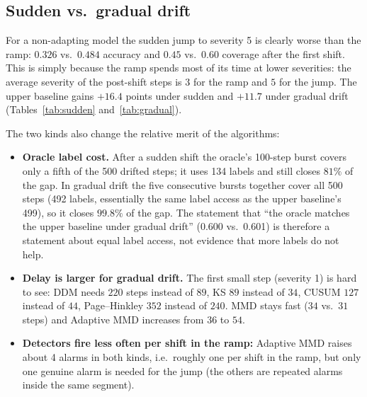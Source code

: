 \documentclass[11pt,a4paper]{article}
\begin{document}
\subsection{Sudden vs.\ gradual drift}

For a non-adapting model the sudden jump to severity 5 is clearly worse than the ramp: $0.326$ vs.\ $0.484$ accuracy
and $0.45$ vs.\ $0.60$ coverage after the first shift. This is simply because the ramp spends most of its time at lower severities: the average severity of the post-shift steps
is $3$ for the ramp and $5$ for the jump.
The upper baseline gains $+16.4$ points under sudden and $+11.7$ under gradual drift (Tables~\ref{tab:sudden} and~\ref{tab:gradual}).

The two kinds also change the relative merit of the algorithms:
\begin{itemize}
 \item \textbf{Oracle label cost.} After a sudden shift the oracle's 100-step burst covers only a fifth of the 500 drifted steps; it uses 134 labels and still closes $81\%$ of the gap.
 In gradual drift the five consecutive bursts together cover all 500 steps (492 labels, essentially the same label access as the upper baseline's 499), so it closes $99.8\%$ of the gap. The statement that ``the oracle matches the upper baseline under gradual drift'' (0.600 vs.\ 0.601) is therefore a statement about equal label access, not evidence that more labels do not help.
 \item \textbf{Delay is larger for gradual drift.} The first small step (severity 1) is hard to see: DDM needs $220$ steps instead of $89$, KS $89$ instead of $34$, CUSUM $127$ instead of $44$, Page--Hinkley $352$ instead of $240$. MMD stays fast ($34$ vs.\ $31$ steps) and Adaptive MMD increases from $36$ to $54$.
 \item \textbf{Detectors fire less often per shift in the ramp:} Adaptive MMD raises about 4 alarms in both kinds, i.e.\ roughly one per shift in the ramp, but only one genuine alarm is needed for the jump (the others are repeated alarms inside the same segment).
\end{itemize}
\end{document}
